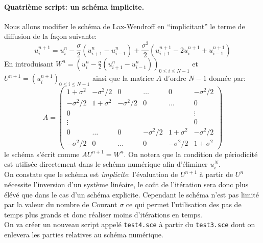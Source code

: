 \documentclass[12pt,a4paper]{article}
\begin{document}
\paragraph{Quatri\`eme script: un sch\'ema implicite.} Nous allons modifier le sch\'ema de Lax-Wendroff en ``implicitant'' le terme de diffusion de la fa\c{c}on suivante:
$$
u_i^{n+1}=u_i^n-\frac{\sigma}{2}(u_{i+1}^n-u_{i-1}^n)+\frac{\sigma^2}{2}(u_{i+1}^{n+1}-2u_i^{n+1}+u_{i-1}^{n+1})
$$ 
En introduisant $W^n =
(u_i^n-\frac{\sigma}{2}(u_{i+1}^n-u_{i-1}^n))_{0\le i\le N-1}$ et
$U^{n+1}=(u_i^{n+1})_{0\le i\le N-1}$ ainsi que la matrice $A$ d'ordre
$N-1$ donn\'ee par:
$$
A = \left(\begin{array}{cccccc}
1+\sigma^2  & -\sigma^2/2 & 0           & \hdots & 0      & -\sigma^2/2 \\
-\sigma^2/2 & 1+\sigma^2  & -\sigma^2/2 & 0      & \hdots & 0 \\
0           &             &             &        &        & \vdots \\
\vdots      &             &             &        &        & 0 \\
0       & \hdots & 0 &-\sigma^2/2 & 1+\sigma^2 &-\sigma^2/2\\
-\sigma^2/2 & 0 & \hdots & 0 & -\sigma^2/2 & 1+\sigma^2
\end{array}\right)
$$ 
le sch\'ema s'\'ecrit comme $AU^{n+1}=W^n$. On notera que la
condition de p\'eriodicit\'e est utilis\'ee directement dans le sch\'ema num\'erique afin d'\'eliminer $u_i^N$. \\ 
\noindent On constate que le sch\'ema est {\it implicite}: l'\'evaluation de $U^{n+1}$ \`a partir
de $U^n$ n\'ecessite l'inversion d'un syst\`eme lin\'eaire, le co\^ut
de l'it\'eration sera donc plus \'el\'ev\'e que dans le cas d'un
sch\'ema explicite. Cependant le sch\'ema n'est pas limit\'e par la
valeur du nombre de Courant $\sigma$ ce qui permet l'utilisation des
pas de temps plus grands et donc r\'ealiser moins d'it\'erations en
temps.\\

\noindent On va cr\'eer un nouveau script appel\'e \texttt{test4.sce} \`a
partir du \texttt{test3.sce} dont on enlevera les parties relatives
au sch\'ema num\'erique.
\end{document}
